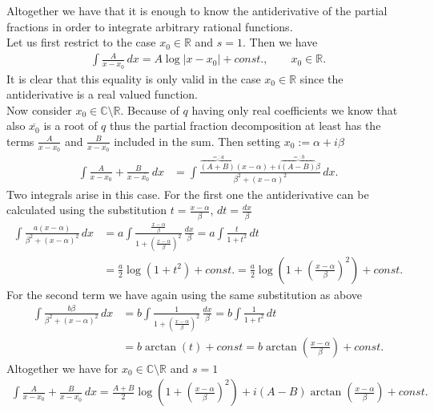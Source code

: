 Altogether we have that it is enough to know the antiderivative of the partial fractions in order to integrate arbitrary rational functions.\\
Let us first restrict to the case $x_{0}\in\mathbb{R}$ and $s=1$. Then we have
\begin{align*}
\int \frac{A}{x-x_{0}}\, dx = A \log|x-x_{0}|+const.,\qquad x_{0}\in\mathbb{R}.
\end{align*}
It is clear that this equality is only valid in the case $x_{0}\in\mathbb{R}$ since the antiderivative is a real valued function.\\
Now consider $x_{0}\in\mathbb{C}\setminus\mathbb{R}$. Because of $q$ having only real coefficients we know that also $\overline{x_{0}}$ is a root of $q$ thus the partial fraction decomposition at least has the terms $\frac{A}{x-x_{0}}$ and $\frac{B}{x-\overline{x_{0}}}$ included in the sum. Then setting $x_{0}:=\alpha+i\beta$
\begin{align*}
\int \frac{A}{x-x_{0}}+\frac{B}{x-\overline{x_{0}}}\, dx &= \int \frac{\overbrace{(A+B)}^{=:a}(x-\alpha)+i\overbrace{(A-B)}^{=:b}\beta}{\beta^{2}+(x-\alpha)^{2}}\, dx.
\end{align*}
Two integrals arise in this case. For the first one the antiderivative can be calculated using the substitution $t=\frac{x-\alpha}{\beta}$, $dt = \frac{dx}{\beta}$
\begin{align*}
\int \frac{a(x-\alpha)}{\beta^{2}+(x-\alpha)^{2}}\, dx &= a\int \frac{\frac{x-\alpha}{\beta}}{1+(\frac{x-\alpha}{\beta})^{2}}\, \frac{dx}{\beta}=a\int \frac{t}{1+t^{2}}\,dt\\
& = \frac{a}{2}\log(1+t^{2})+const. = \frac{a}2\log\left(1+\left(\frac{x-\alpha}{\beta}\right)^{2}\right)+const.
\end{align*}
For the second term we have again using the same substitution as above
\begin{align*}
\int \frac{b\beta}{\beta^{2}+(x-\alpha)^{2}}\, dx & = b\int \frac{1}{1+(\frac{x-\alpha}{\beta})^{2}}\, \frac{dx}{\beta}=b\int \frac{1}{1+t^{2}}\,dt\\
& = b \arctan(t) + const = b \arctan\left(\frac{x-\alpha}{\beta}\right) + const.
\end{align*}
Altogether we have for $x_{0}\in\mathbb{C}\setminus\mathbb{R}$ and $s=1$
\begin{align*}
\int \frac{A}{x-x_{0}}+\frac{B}{x-\overline{x_{0}}}\, dx = \frac{A+B}2\log\left(1+\left(\frac{x-\alpha}{\beta}\right)^{2}\right)+i(A-B)\arctan\left(\frac{x-\alpha}{\beta}\right) + const.
\end{align*}
